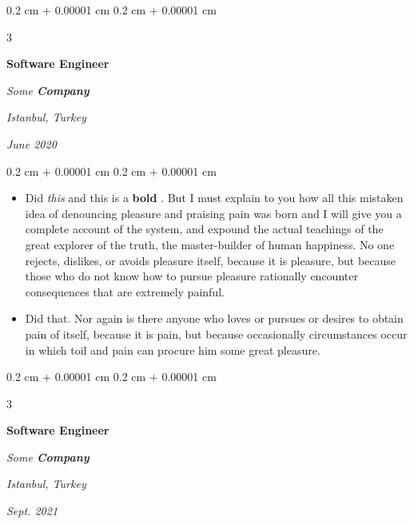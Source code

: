 \documentclass[10pt, letterpaper]{article}
\newenvironment{highlights}{
    \begin{itemize}[
        topsep=0.10 cm,
        parsep=0.10 cm,
        partopsep=0pt,
        itemsep=0pt,
        leftmargin=0.4 cm + 10pt + 0.6 cm
    ]
}{
    \end{itemize}
} %
\newenvironment{onecolentry}{
    \begin{adjustwidth}{
        0.2 cm + 0.00001 cm
    }{
        0.2 cm + 0.00001 cm
    }
}{
    \end{adjustwidth}
} %
\newenvironment{threecolentry}[3][]{
    \onecolentry
    \def\thirdColumn{#3}
    \setcolumnwidth{0.6 cm, \fill, 4.5 cm}
    \begin{paracol}{3}
    #2 \switchcolumn
}{
    \switchcolumn \raggedleft \thirdColumn
    \end{paracol}
    \endonecolentry
} %
\let\hrefWithoutArrow\href
\renewcommand{\href}[2]{\hrefWithoutArrow{#1}{\mbox{\ifthenelse{\equal{#2}{}}{ }{#2 }\raisebox{.15ex}{\footnotesize \faExternalLink*}}}}
\begin{document}
        \vspace{0.2 cm-3px}

        \begin{threecolentry}{
            \vspace*{\fill}
            \textbullet
            \vspace*{3px}
            \vspace*{\fill}
        }{
        \textit{Istanbul, Turkey}    
            
        \textit{June 2020}}
            \textbf{Software Engineer}
            
            \textit{Some \textbf{Company}}
        \end{threecolentry}

        \vspace{0.10 cm-3px}
        \begin{onecolentry}
            \begin{highlights}
                \item Did \textit{this} and this is a \textbf{bold} \href{https://example.com}{link}. But I must explain to you how all this mistaken idea of denouncing pleasure and praising pain was born and I will give you a complete account of the system, and expound the actual teachings of the great explorer of the truth, the master-builder of human happiness. No one rejects, dislikes, or avoids pleasure itself, because it is pleasure, but because those who do not know how to pursue pleasure rationally encounter consequences that are extremely painful.
                \item Did that. Nor again is there anyone who loves or pursues or desires to obtain pain of itself, because it is pain, but because occasionally circumstances occur in which toil and pain can procure him some great pleasure.
            \end{highlights}
        \end{onecolentry}


        \vspace{0.2 cm-3px}

        \begin{threecolentry}{
            \vspace*{\fill}
            \textbullet
            \vspace*{3px}
            \vspace*{\fill}
        }{
        \textit{Istanbul, Turkey}    
            
        \textit{Sept. 2021}}
            \textbf{Software Engineer}
            
            \textit{Some \textbf{Company}}
        \end{threecolentry}
\end{document}
